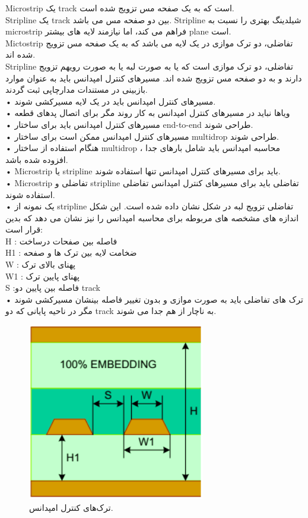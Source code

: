 Microstrip یک track است که به یک صفحه مس تزویج شده است.\\
Stripline یک track بین دو صفحه مس می باشد. Stripline شیلدینگ بهتری را نسبت به
microstrip فراهم می کند، اما نیازمند لایه های بیشتر plane است. \\
Mictostrip تفاضلی، دو ترک موازی در یک لایه می باشد که به یک صفحه مس تزویج شده اند.\\
Stripline تفاضلی، دو ترک موازی است که یا به صورت لبه یا به صورت رویهم تزویج دارند و به دو
صفحه مس تزویج شده اند.
 مسیرهای کنترل امپدانس باید به عنوان موارد بازبینی در مستندات مدارچاپی ثبت گردند.\\
• مسیرهای کنترل امپدانس باید در یک لایه مسیرکشی شوند.\\
• ویاها نباید در مسیرهای کنترل امپدانس به کار روند مگر برای اتصال پدهای قطعه\\
• مسیرهای کنترل امپدانس باید برای ساختار end-to-end طراحی شوند.\\
• مسیرهای کنترل امپدانس ممکن است برای ساختار multidrop طراحی شوند.\\
• هنگام استفاده از ساختار multidrop ، محاسبه امپدانس باید شامل بارهای جدا افزوده
شده باشد.\\

• Microstrip یا stripline باید برای مسیرهای کنترل امپدانس تنها استفاده شوند.\\
• Microstrip تفاضلی و stripline تفاضلی باید برای مسیرهای کنترل امپدانس تفاضلی
استفاده شوند.\\
• یک نمونه از stripline تفاضلی تزویج لبه در شکل  نشان داده شده است. این شکل
اندازه های مشخصه های مربوطه برای محاسبه امپدانس را نیز نشان می دهد که بدین
قرار است:\\
H : فاصله بین صفحات درساخت\\
H1 : ضخامت لایه بین ترک ها و صفحه\\
W : پهنای بالای ترک\\
W1 : پهنای پایین ترک\\
S :فاصله بین پایین دو track\\
• ترک های تفاضلی باید به صورت موازی و بدون تغییر فاصله بینشان مسیرکشی شوند مگر
در ناحیه پایانی که دو track به ناچار از هم جدا می شوند.

\begin{figure}[!h]
	\centering
	\includegraphics[width=0.4\linewidth]{Assets/impedance.png}
	\caption{ترک‌های کنترل امپدانس.}
	\label{fig:impedance}
\end{figure}

